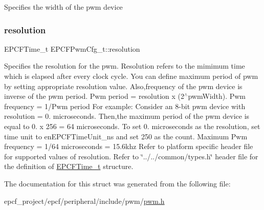 Specifies the width of the pwm device \mbox{\label{structEPCFPwmCfg__t_af87e716fc1cbe8316b4b69923b7e9b73}} 
\subsubsection{\texorpdfstring{resolution}{resolution}}
{\footnotesize\ttfamily E\+P\+C\+F\+Time\+\_\+t E\+P\+C\+F\+Pwm\+Cfg\+\_\+t\+::resolution}

Specifies the resolution for the pwm. Resolution refers to the mimimum time which is elapsed after every clock cycle. You can define maximum period of pwm by setting appropriate resolution value. Also,frequency of the pwm device is inverse of the pwm period. Pwm period = resolution x (2$^\wedge$pwm\+Width). Pwm frequency = 1/\+Pwm period For example\+: Consider an 8-\/bit pwm device with resolution = 0. microseconds. Then,the maximum period of the pwm device is equal to 0. x 256 = 64 microseconds. To set 0. microseconds as the resolution, set time unit to en\+E\+P\+C\+F\+Time\+Unit\+\_\+ns and set 250 as the count. Maximum Pwm frequency = 1/64 microseconds = 15.\+6khz Refer to platform specific header file for supported values of resolution. Refer to \char`\"{}../../common/types.\+h\char`\"{} header file for the definition of \mbox{\hyperlink{}{E\+P\+C\+F\+Time\+\_\+t}} structure. 

The documentation for this struct was generated from the following file\+:\begin{DoxyCompactItemize}
\item 
epcf\+\_\+project/epcf/peripheral/include/pwm/\mbox{\hyperlink{pwm_8h}{pwm.\+h}}\end{DoxyCompactItemize}

